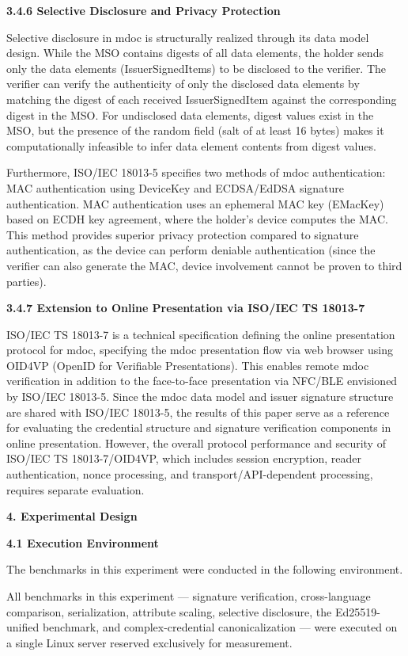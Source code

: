 \textbf{3.4.6 Selective Disclosure and Privacy Protection}

Selective disclosure in mdoc is structurally realized through its data model design. While the MSO contains digests of all data elements, the holder sends only the data elements (IssuerSignedItems) to be disclosed to the verifier. The verifier can verify the authenticity of only the disclosed data elements by matching the digest of each received IssuerSignedItem against the corresponding digest in the MSO. For undisclosed data elements, digest values exist in the MSO, but the presence of the random field (salt of at least 16 bytes) makes it computationally infeasible to infer data element contents from digest values.

Furthermore, ISO/IEC 18013-5 specifies two methods of mdoc authentication: MAC authentication using DeviceKey and ECDSA/EdDSA signature authentication. MAC authentication uses an ephemeral MAC key (EMacKey) based on ECDH key agreement, where the holder's device computes the MAC. This method provides superior privacy protection compared to signature authentication, as the device can perform deniable authentication (since the verifier can also generate the MAC, device involvement cannot be proven to third parties).

\textbf{3.4.7 Extension to Online Presentation via ISO/IEC TS 18013-7}

ISO/IEC TS 18013-7 is a technical specification defining the online presentation protocol for mdoc, specifying the mdoc presentation flow via web browser using OID4VP (OpenID for Verifiable Presentations). This enables remote mdoc verification in addition to the face-to-face presentation via NFC/BLE envisioned by ISO/IEC 18013-5. Since the mdoc data model and issuer signature structure are shared with ISO/IEC 18013-5, the results of this paper serve as a reference for evaluating the credential structure and signature verification components in online presentation. However, the overall protocol performance and security of ISO/IEC TS 18013-7/OID4VP, which includes session encryption, reader authentication, nonce processing, and transport/API-dependent processing, requires separate evaluation.

\textbf{4. Experimental Design}

\textbf{4.1 Execution Environment}

The benchmarks in this experiment were conducted in the following environment.

All benchmarks in this experiment --- signature verification, cross-language comparison, serialization, attribute scaling, selective disclosure, the Ed25519-unified benchmark, and complex-credential canonicalization --- were executed on a single Linux server reserved exclusively for measurement.

